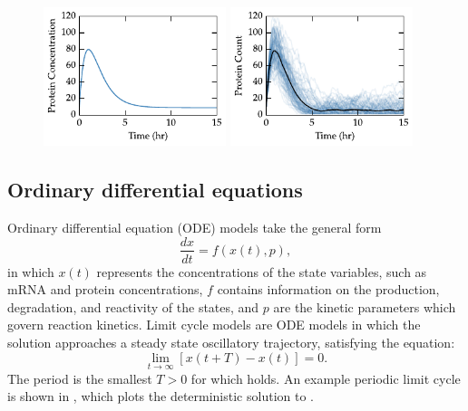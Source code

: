 \begin{figure}[tbp]
  \centering
  \includegraphics[width=0.475\textwidth]{chap1/figures/sysbio_trajs1.pdf}
  \includegraphics[width=0.475\textwidth]{chap1/figures/sysbio_trajs2.pdf}
  \label{fig:extrajs}
\end{figure}

\subsection{Ordinary differential equations}\label{sec:odes}

Ordinary differential equation (ODE) models take the general form
\begin{equation}
  \frac{dx}{dt} = f(x(t), p),
  \label{eq:odefn}
\end{equation}
in which $x(t)$ represents the concentrations of the state variables, such as mRNA and protein concentrations, $f$ contains information on the production, degradation, and reactivity of the states, and $p$ are the kinetic parameters which govern reaction kinetics.
Limit cycle models are ODE models in which the solution approaches a steady state oscillatory trajectory, satisfying the equation:
\begin{equation}
  \lim_{t \to \infty} \left[ x(t + T) - x(t) \right] = 0.
  \label{eq:limit5}
\end{equation}
The period is the smallest $T > 0$ for which  holds. 
An example periodic limit cycle is shown in , which plots the deterministic solution to .

